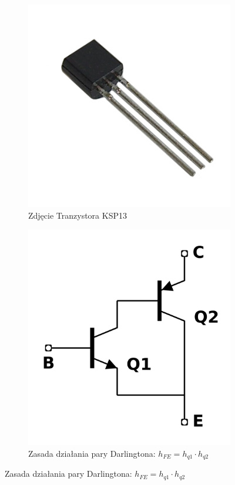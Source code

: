 \documentclass[11pt, a4paper]{article}
\begin{document}
\vspace{0.25cm}
\begin{figure}[h]
\centering
\begin{subfigure}{.5\textwidth}
\centering
\includegraphics[width=.7\linewidth]{fig/KY-036/hi-1064-065920-TO-92.jpg}
\caption{Zdjęcie Tranzystora KSP13}
\label{fig:_zdjecie_elementu}
\end{subfigure}%
\begin{subfigure}{.5\textwidth}
\centering
\includegraphics[width=.7\linewidth]{fig/KY-036/1200px-Compound_trans.svg.png}
\caption{Zasada działania pary Darlingtona: $h_{FE} = h_{q1} \cdot h_{q2}$}
\label{fig:_zasada_dzialania_elementu}
\end{subfigure}
\label{fig:element}
\end{figure}
\vspace{0.25cm}
\end{document}
